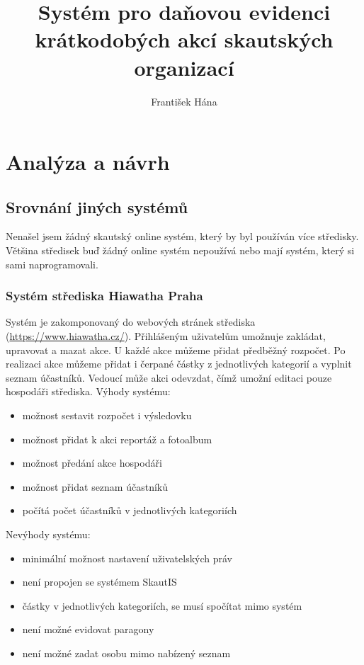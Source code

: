 \documentclass[thesis=B,czech]{FITthesis}[2011/06/14]
\title{Systém pro daňovou evidenci krátkodobých akcí skautských organizací}
\author{František Hána} %
\begin{document}

\begin{introduction}
\end{introduction}

\chapter{Analýza a návrh}
\section{Srovnání jiných systémů}
Nenašel jsem žádný skautský online systém, který by byl používán více středisky. Většina středisek buď žádný online systém nepoužívá nebo mají systém, který si sami naprogramovali.
\subsection{Systém střediska Hiawatha Praha}
Systém je zakomponovaný do webových stránek střediska (\url{https://www.hiawatha.cz/}). Přihlášeným uživatelům umožnuje zakládat, upravovat a mazat akce. U každé akce můžeme přidat předběžný rozpočet. Po realizaci akce můžeme přidat i čerpané částky z jednotlivých kategorií a vyplnit seznam účastníků. Vedoucí může akci odevzdat, čímž umožní editaci pouze hospodáři střediska.
Výhody systému:
\begin{itemize}
	\item možnost sestavit rozpočet i výsledovku
	\item možnost přidat k akci reportáž a fotoalbum
	\item možnost předání akce hospodáři
	\item možnost přidat seznam účastníků
	\item počítá počet účastníků v jednotlivých kategoriích
\end{itemize}
Nevýhody systému:
\begin{itemize}
	\item minimální možnost nastavení uživatelských práv
	\item není propojen se systémem SkautIS
	\item částky v jednotlivých kategoriích, se musí spočítat mimo systém
	\item není možné evidovat paragony
	\item není možné zadat osobu mimo nabízený seznam
\end{itemize}
\end{document}
